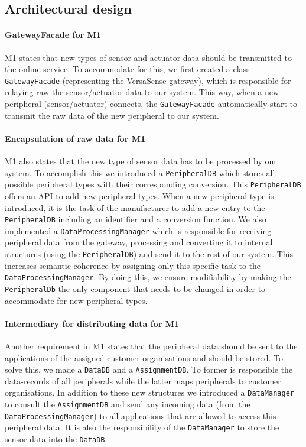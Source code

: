 \documentclass[english]{sareport}
\begin{document}
\subsection{Architectural design}
\paragraph{GatewayFacade for M1}
M1 states that new types of sensor and actuator data should be transmitted to the online service. To accommodate for this, we first created a class \texttt{GatewayFacade} (representing the VersaSense gateway), which is responsible for relaying raw the sensor/actuator data to our system. This way, when a new peripheral (sensor/actuator) connects, the \texttt{GatewayFacade} automatically start to transmit the raw data of the new peripheral to our system.
\paragraph{Encapsulation of raw data for M1}
M1 also states that the new type of sensor data has to be processed by our system. To accomplish this we introduced a \texttt{PeripheralDB} which stores all possible peripheral types with their corresponding conversion. This \texttt{PeripheralDB} offers an API to add new peripheral types. When a new peripheral type is introduced, it is the task of the manufacturer to add a new entry to the \texttt{PeripheralDB} including an identifier and a conversion function. We also implemented a \texttt{DataProcessingManager} which is responsible for receiving peripheral data from the gateway, processing and converting it to internal structures (using the \texttt{PeripheralDB}) and send it to the rest of our system. This increases semantic coherence by assigning only this specific task to the \texttt{DataProcessingManager}. By doing this, we ensure modifiability by making the \texttt{PeripheralDb} the only component that needs to be changed in order to accommodate for new peripheral types.
\paragraph{Intermediary for distributing data for M1}
Another requirement in M1 states that the peripheral data should be sent to the applications of the assigned customer organisations and should be stored. To solve this, we made a \texttt{DataDB} and a \texttt{AssignmentDB}. To former is responsible the data-records of all peripherals while the latter maps peripherals to customer organisations. In addition to these new structures we introduced a \texttt{DataManager} to consult the \texttt{AssignmentDB} and send any incoming data (from the \texttt{DataProcessingManager}) to all applications that are allowed to access this peripheral data. It is also the responsibility of the \texttt{DataManager} to store the sensor data into the \texttt{DataDB}.
\end{document}
